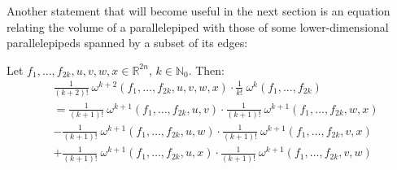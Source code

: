 \documentclass[../SymplecticSimplices.tex]{subfiles}
\begin{document}
Another statement that will become useful in the next section is an equation relating the volume of a parallelepiped with those of some lower-dimensional parallelepipeds spanned by a subset of its edges:

\begin{lemma}
  \label{lemma:subsimplexproduct}
  Let \( f_1, \dots, f_{2k}, u, v, w, x \in \mathbb{R}^{2n} \), \( k \in \mathbb{N}_0 \). Then:
\begin{equation}
  \label{equation:subsimplexproduct}
  \begin{split}
  & \frac{1}{\left(k+2\right)!} \: \omega^{k+2} \left( f_1, \dots, f_{2k}, u, v, w, x \right) \cdot \frac{1}{k!} \: \omega^{k} \left( f_1, \dots, f_{2k} \right)
  \\ & = \frac{1}{\left(k+1\right)!} \: \omega^{k+1} \left( f_1, \dots, f_{2k}, u, v \right) \cdot \frac{1}{\left(k+1\right)!} \: \omega^{k+1} \left( f_1, \dots, f_{2k}, w, x \right)
  \\ & - \frac{1}{\left(k+1\right)!} \: \omega^{k+1} \left( f_1, \dots, f_{2k}, u, w \right) \cdot \frac{1}{\left(k+1\right)!} \: \omega^{k+1} \left( f_1, \dots, f_{2k}, v, x \right)
  \\ & + \frac{1}{\left(k+1\right)!} \: \omega^{k+1} \left( f_1, \dots, f_{2k}, u, x \right) \cdot \frac{1}{\left(k+1\right)!} \: \omega^{k+1} \left( f_1, \dots, f_{2k}, v, w \right)
  \end{split}
\end{equation}
\end{lemma}
\end{document}
